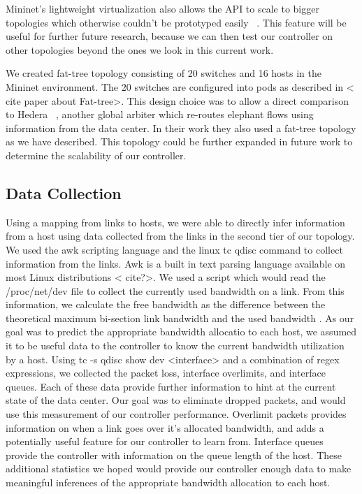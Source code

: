 Mininet’s lightweight virtualization also allows the API to scale to bigger topologies which otherwise couldn’t be prototyped easily ~\cite{mininet}. This feature will be useful for further future research, because we can then test our controller on other topologies beyond the ones we look in this current work. 

We created  fat-tree topology consisting of 20 switches and 16 hosts in the Mininet environment. The 20 switches are configured into pods as described in < cite paper about Fat-tree>. This design choice was to allow a direct comparison to Hedera  ~\cite{hedera}, another global arbiter which re-routes elephant flows using information from the data center.  In their work they also used a fat-tree topology as we have described. This topology could be further expanded in future work to determine the scalability of our controller. 

\subsection{Data Collection }
	Using a mapping from links to hosts, we were able to directly infer information from a host using data collected from the links in the second tier of our topology. We used the awk scripting language and the linux tc qdisc command to collect information from the links. 
Awk is a built in text parsing language available on most Linux distributions < cite?>. We used a script which would read the /proc/net/dev file to collect the currently used  bandwidth on a link. From this information, we calculate the free bandwidth as the difference between the theoretical maximum bi-section link bandwidth and the used bandwidth . As our goal was to predict the appropriate bandwidth allocatio to each host, we assumed it to be useful data to the controller to know the current bandwidth utilization by a host. 
Using tc -s qdisc show dev <interface> and a combination of regex expressions, we collected the packet loss, interface overlimits, and interface queues. Each of these data provide further information to hint at the current state of the data center. Our goal was to eliminate dropped packets, and would  use this measurement of our controller performance. Overlimit packets provides information on when a link goes over it’s allocated bandwidth, and adds a potentially useful feature for our controller to learn from. Interface queues provide the controller with information on the queue length of the host.  These additional statistics we hoped would provide our controller enough data to make meaningful inferences of the appropriate bandwidth allocation to each host. 
